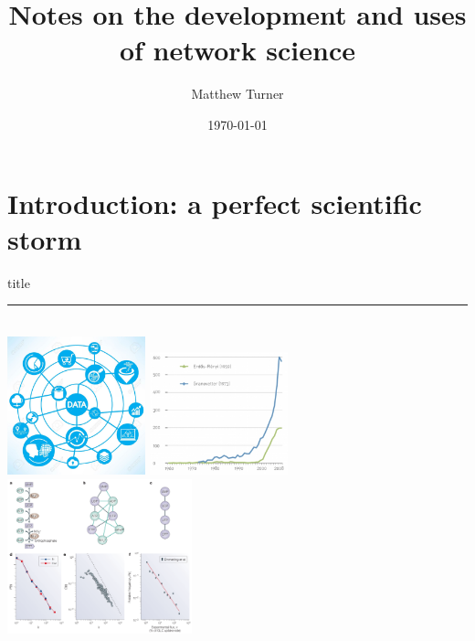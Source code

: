 \documentclass[notes]{beamer}
\title{Notes on the development and uses of network science}
\author{Matthew Turner}
\institute{University of California, Merced}
\date{\today}
\begin{document}
{ 
\frame{\titlepage}}



\section{Introduction: a perfect scientific storm}
\begin{frame}[plain]
  \vfill
  \centering
  \begin{beamercolorbox}[sep=8pt,center,shadow=true,rounded=true]{title}
    \insertsectionhead\par%
    \color{oxfordblue}\noindent\rule{10cm}{1pt} \\[1em]
    \includegraphics[width=0.3\textwidth]{Figures/internet-data.jpg}
    \includegraphics[width=0.3\textwidth]{Figures/ErdosRenyi-GranovetterCitations.png}
    \includegraphics[width=0.4\textwidth]{Figures/NetworkCellBiologyIntro.png}
  \end{beamercolorbox}
  \vfill
\end{frame}
\end{document}
